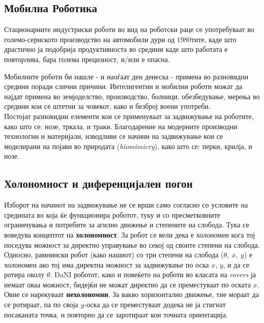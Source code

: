 \documentclass[12pt]{article}
\begin{document}
  \subsection{Мобилна Роботика}
    Стационарните индустриски роботи во вид на роботски раце се употребуваат во големо-сериското производство на автомобили дури од 1980тите, каде што драстично ја подобрија продуктивноста во средини каде што работата е повторлива, бара голема прецизност, и/или е опасна.

    \bigbreak
    Мобилните роботи би нашле - и наоѓаат ден денеска - примена во разновидни средини поради слични причини. Интелигентни и мобилни роботи можат да најдат примена во земјоделство, производство, болници, обезбедување, мерења во средини кои се штетни за човекот, како и безброј воени употреби.\\
    Постојат разновидни елементи кои се применуваат за задвижување на роботите, како што се: нозе, тркала, и траки. Благодарение на модерните производни технологии и материјали, изводливи се начини на задвижување кои се моделирани на појави во природата (\textit{biomimicry}), како што се: перки, крилја, и нозе.

    \subsection{Холономност и диференцијален погон}
      Изборот на начинот на задвижување не се врши само согласно со условите на средината во која ќе функционира роботот, туку и со пресметковните ограничувања и потребите за агилно движење и степените на слобода. Тука се воведува концептот на \textbf{холономност}. За робот се вели дека е холономен кога тој поседува можност за директно управување во секој од своите степени на слобода. Односно, рамнински робот (како нашиот) со три степени на слобода ($\theta,\ x,\ y$) е холономен ако тој има директна можност за задвижување по оска $x$, $y$, и да се ротира околу $\theta$. DaNI роботот, како и повеќето на роботи во класата на \textit{rovers} ја немаат оваа можност, бидејќи не можат директно да се преместуваат по оската $x$. Овие се нарекуваат \textbf{нехолономни}. За вакво хоризонтално движење, тие мораат да се ротираат, па по своја $y$-оска да се преместуваат додека не ја стигнат посаканата точка, и повторно да се заротираат кон точната ориентација.
\end{document}
